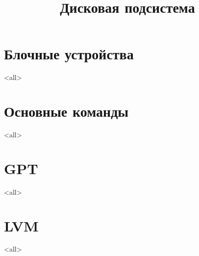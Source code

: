 

\title{Дисковая подсистема}









\section{Блочные устройства}
\mode<all>{}
\section{Основные команды}
\mode<all>{}
\section{GPT}
\mode<all>{}
\section{LVM}
\mode<all>{}


